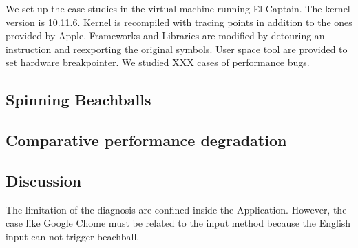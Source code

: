 We set up the case studies in the virtual machine running El Captain.
The kernel version is 10.11.6.
Kernel is recompiled with tracing points in addition to the ones provided by Apple.
Frameworks and Libraries are modified by detouring an instruction and reexporting the original symbols.
User space tool are provided to set hardware breakpointer.
We studied XXX cases of performance bugs.
\par
\subsection{Spinning Beachballs}

\subsection{Comparative performance degradation}
\par
\subsection{Discussion}
The limitation of the diagnosis are confined inside the Application.
However, the case like Google Chome must be related to the input method because the English input can not trigger beachball.
